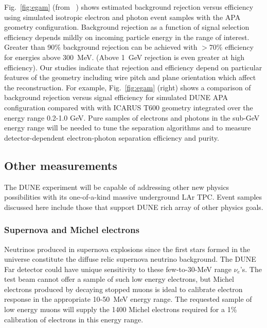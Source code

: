 Fig.~\ref{fig:egam} (from ~\cite{dunecdr})
 shows estimated background rejection versus efficiency using 
simulated isotropic electron and photon event samples  with the 
APA geometry configuration.
Background rejection as a function of signal
selection efficiency depends mildly
on incoming particle energy in the range of interest. 
Greater than 90\% background rejection can be 
achieved with $>$70\% efficiency for energies above 300~MeV. (Above 1~GeV 
rejection is even greater at high efficiency).
Our studies indicate that rejection and efficiency depend 
on particular features of the geometry including wire pitch and plane 
orientation which affect the reconstruction. 
For example, Fig.~\ref{fig:egam} (right) shows a comparison of background
rejection versus signal efficiency for simulated
DUNE APA configuration compared with with ICARUS T600 geometry
integrated over the energy range 0.2-1.0 GeV. 
Pure samples of electrons and photons in the sub-GeV energy range will be
needed to tune the separation algorithms and to measure 
detector-dependent electron-photon separation efficiency and purity.







\subsection{Other measurements} 
\label{sec_other}

The DUNE experiment will be capable of addressing other new physics possibilities with its one-of-a-kind
massive underground LAr TPC. Event samples discussed here include those that support DUNE
rich array of other physics goals. 


\subsubsection{Supernova and Michel electrons}

Neutrinos produced in supernova explosions since the first stars formed in the universe constitute the
diffuse relic supernova neutrino background. The DUNE Far detector could have unique sensitivity to these
few-to-30-MeV range $\nu_e$'s. 
The test beam cannot offer a sample of  such low energy electrons, but Michel electrons  produced by 
decaying stopped muons is ideal to calibrate electron response in the appropriate 10-50~MeV energy range. 
The requested sample of low energy muons will supply the 1400 Michel electrons required for a 1\% 
calibration of electrons in this energy range. 

